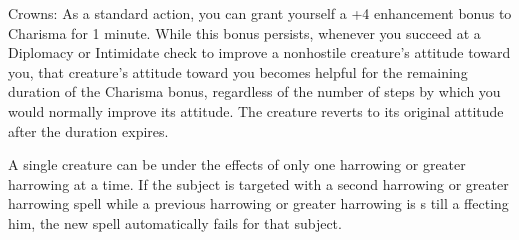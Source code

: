 {Crowns: As a standard action, you can grant yourself a +4 enhancement bonus to Charisma for 1 minute. While this bonus persists, whenever you succeed at a Diplomacy or Intimidate check to improve a nonhostile creature's attitude toward you, that creature's attitude toward you becomes helpful for the remaining duration of the Charisma bonus, regardless of the number of steps by which you would normally improve its attitude. The creature reverts to its original attitude after the duration expires.

A single creature can be under the effects of only one harrowing or greater harrowing at a time. If the subject is targeted with a second harrowing or greater harrowing spell while a previous harrowing or greater harrowing is s till a ffecting him, the new spell automatically fails for that subject.}
    